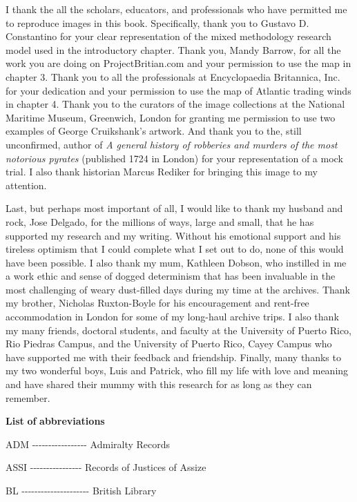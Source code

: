 I thank the all the scholars, educators, and professionals who have permitted me to reproduce images in this book. Specifically, thank you to Gustavo D. Constantino for your clear representation of the mixed methodology research model used in the introductory chapter. Thank you, Mandy Barrow, for all the work you are doing on ProjectBritian.com and your permission to use the map in chapter 3. Thank you to all the professionals at Encyclopaedia Britannica, Inc. for your dedication and your permission to use the map of Atlantic trading winds in chapter 4. Thank you to the curators of the image collections at the National Maritime Museum, Greenwich, London for granting me permission to use two examples of George Cruikshank’s artwork. And thank you to the, still unconfirmed, author of \textit{A general history of robberies and murders of the most notorious pyrates} (published 1724 in London) for your representation of a mock trial. I also thank historian Marcus Rediker for bringing this image to my attention. 

Last, but perhaps most important of all, I would like to thank my husband and rock, Jose Delgado, for the millions of ways, large and small, that he has supported my research and my writing.  Without his emotional support and his tireless optimism that I could complete what I set out to do, none of this would have been possible. I also thank my mum, Kathleen Dobson, who instilled in me a work ethic and sense of dogged determinism that has been invaluable in the most challenging of weary dust-filled days during my time at the archives. Thank my brother, Nicholas Ruxton-Boyle for his encouragement and rent-free accommodation in London for some of my long-haul archive trips. I also thank my many friends, doctoral students, and faculty at the University of Puerto Rico, Rio Piedras Campus, and the University of Puerto Rico, Cayey Campus who have supported me with their feedback and friendship. Finally, many thanks to my two wonderful boys, Luis and Patrick, who fill my life with love and meaning and have shared their mummy with this research for as long as they can remember. 

\textbf{List} \textbf{of} \textbf{abbreviations}

ADM -{}-{}-{}-{}-{}-{}-{}-{}-{}-{}-{}-{}-{}-{}-{}-{}-  Admiralty Records

ASSI -{}-{}-{}-{}-{}-{}-{}-{}-{}-{}-{}-{}-{}-{}-{}-  Records of Justices of Assize

BL -{}-{}-{}-{}-{}-{}-{}-{}-{}-{}-{}-{}-{}-{}-{}-{}-{}-{}-{}-{}-  British Library

